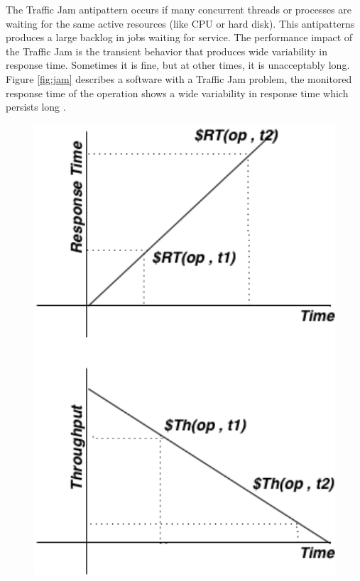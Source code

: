 \documentclass{report}
\begin{document}
The Traffic Jam antipattern occurs if many concurrent threads or processes are waiting for the same  active resources (like CPU or hard disk). This antipatterns produces a large backlog in jobs waiting for service. The performance impact of the Traffic Jam is the transient behavior that produces wide variability in response time. Sometimes it is fine, but at other times, it is unacceptably long. Figure \ref{fig:jam} describes a software with a Traffic Jam problem, the monitored response time of the operation shows a wide variability in response time which persists long \cite{Vetoio2011}. 


\begin{figure}[!h]
\begin{minipage}{.5\textwidth}
\centering
\includegraphics[width=1\textwidth]{./images/ramp.png}

\end{minipage}
\end{figure}
\end{document}
